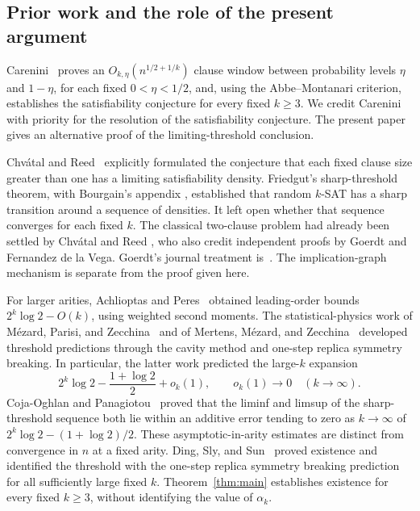 \subsection{Prior work and the role of the present argument}

Carenini~\cite[Theorem~1.1 and Corollary~1.2]{Carenini2026Polynomial}
proves an \(O_{k,\eta}(n^{1/2+1/k})\) clause window between probability
levels \(\eta\) and \(1-\eta\), for each fixed \(0<\eta<1/2\), and, using
the Abbe--Montanari criterion, establishes the satisfiability conjecture for
every fixed \(k\ge3\). We credit Carenini with priority for the resolution
of the satisfiability conjecture. The present paper gives an alternative
proof of the limiting-threshold conclusion.

Chv\'atal and Reed~\cite{CR} explicitly formulated the conjecture that
each fixed clause size greater than one has a limiting satisfiability
density. Friedgut's sharp-threshold theorem, with Bourgain's appendix
\cite[Theorem~1.3]{Friedgut}, established that random \(k\)-SAT has a
sharp transition around a sequence of densities. It left open whether
that sequence converges for each fixed \(k\). The classical two-clause
problem had already been settled by Chv\'atal and Reed
\cite[Theorems~3--4]{CR}, who also credit independent proofs by Goerdt
and Fernandez de la Vega. Goerdt's journal treatment is~\cite{Goerdt}.
The implication-graph mechanism is separate from the proof given here.

For larger arities, Achlioptas and Peres~\cite{AP} obtained leading-order
bounds \(2^k\log2-O(k)\), using weighted second moments. The
statistical-physics work of M\'ezard, Parisi, and Zecchina~\cite{MPZ}
and of Mertens, M\'ezard, and Zecchina~\cite{MMZ} developed threshold
predictions through the cavity method and one-step replica symmetry
breaking. In particular, the latter work predicted the large-\(k\)
expansion
\[
 2^k\log2-\frac{1+\log2}{2}+o_k(1),
 \qquad o_k(1)\longrightarrow0\quad(k\longrightarrow\infty).
\]
Coja-Oghlan and Panagiotou~\cite[Theorem~1.1]{COP} proved that the
liminf and limsup of the sharp-threshold sequence both lie within an
additive error tending to zero as \(k\to\infty\) of
\(2^k\log2-(1+\log2)/2\). These asymptotic-in-arity estimates are
distinct from convergence in \(n\) at a fixed arity. Ding, Sly, and
Sun~\cite{DSS} proved existence and identified the threshold with the
one-step replica symmetry breaking prediction for all sufficiently
large fixed \(k\). Theorem~\ref{thm:main} establishes existence for every
fixed \(k\ge3\), without identifying the value of \(\alpha_k\).

